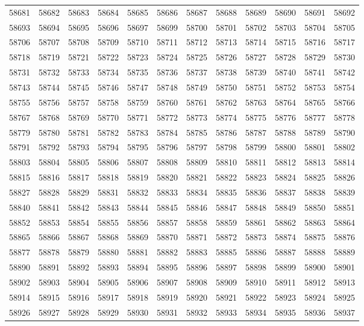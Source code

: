 \begin{center}
\begin{longtable}{llllllllllll}
58681 &58682 &58683 &58684 &58685 &58686 &58687 &58688 &58689 &58690 &58691 &58692 \\
58693 &58694 &58695 &58696 &58697 &58699 &58700 &58701 &58702 &58703 &58704 &58705 \\
58706 &58707 &58708 &58709 &58710 &58711 &58712 &58713 &58714 &58715 &58716 &58717 \\
58718 &58719 &58721 &58722 &58723 &58724 &58725 &58726 &58727 &58728 &58729 &58730 \\
58731 &58732 &58733 &58734 &58735 &58736 &58737 &58738 &58739 &58740 &58741 &58742 \\
58743 &58744 &58745 &58746 &58747 &58748 &58749 &58750 &58751 &58752 &58753 &58754 \\
58755 &58756 &58757 &58758 &58759 &58760 &58761 &58762 &58763 &58764 &58765 &58766 \\
58767 &58768 &58769 &58770 &58771 &58772 &58773 &58774 &58775 &58776 &58777 &58778 \\
58779 &58780 &58781 &58782 &58783 &58784 &58785 &58786 &58787 &58788 &58789 &58790 \\
58791 &58792 &58793 &58794 &58795 &58796 &58797 &58798 &58799 &58800 &58801 &58802 \\
58803 &58804 &58805 &58806 &58807 &58808 &58809 &58810 &58811 &58812 &58813 &58814 \\
58815 &58816 &58817 &58818 &58819 &58820 &58821 &58822 &58823 &58824 &58825 &58826 \\
58827 &58828 &58829 &58831 &58832 &58833 &58834 &58835 &58836 &58837 &58838 &58839 \\
58840 &58841 &58842 &58843 &58844 &58845 &58846 &58847 &58848 &58849 &58850 &58851 \\
58852 &58853 &58854 &58855 &58856 &58857 &58858 &58859 &58861 &58862 &58863 &58864 \\
58865 &58866 &58867 &58868 &58869 &58870 &58871 &58872 &58873 &58874 &58875 &58876 \\
58877 &58878 &58879 &58880 &58881 &58882 &58883 &58885 &58886 &58887 &58888 &58889 \\
58890 &58891 &58892 &58893 &58894 &58895 &58896 &58897 &58898 &58899 &58900 &58901 \\
58902 &58903 &58904 &58905 &58906 &58907 &58908 &58909 &58910 &58911 &58912 &58913 \\
58914 &58915 &58916 &58917 &58918 &58919 &58920 &58921 &58922 &58923 &58924 &58925 \\
58926 &58927 &58928 &58929 &58930 &58931 &58932 &58933 &58934 &58935 &58936 &58937 \\

\end{longtable}
\end{center}
